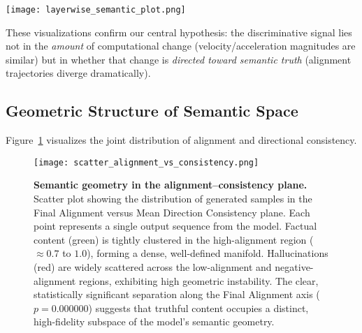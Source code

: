 \documentclass[11pt]{article}
\begin{document}
\begin{figure*}[t]
\centering
\texttt{[image: layerwise\_semantic\_plot.png]}
\caption{\textbf{Comprehensive trajectory dynamics analysis.} (Top-left) Velocity distributions overlap substantially—both factual and hallucinated content undergo similar magnitudes of representational change. (Top-right) Acceleration (directional consistency) shows similar distributions. (Bottom-left) Alignment gain separates classes: factual content increases alignment while hallucinations decrease. (Bottom-right) Convergence analysis reveals factual content converges in deeper layers (8--10) while hallucinations show early pseudo-convergence (layers 4--6) followed by divergence.}
\label{fig:layerwise_semantic_plot}
\end{figure*}

These visualizations confirm our central hypothesis: the discriminative signal lies not in the \emph{amount} of computational change (velocity/acceleration magnitudes are similar) but in whether that change is \emph{directed toward semantic truth} (alignment trajectories diverge dramatically).

\subsection{Geometric Structure of Semantic Space}

Figure~\ref{fig:semantic_geometry_extended} visualizes the joint distribution of alignment and directional consistency.

\begin{figure}[h]
\centering
\texttt{[image: scatter\_alignment\_vs\_consistency.png]}
\caption{\textbf{Semantic geometry in the alignment--consistency plane.}
Scatter plot showing the distribution of generated samples in the Final Alignment versus Mean Direction Consistency plane.
Each point represents a single output sequence from the model.
Factual content (green) is tightly clustered in the high-alignment region ($\approx 0.7$ to $1.0$), forming a dense, well-defined manifold.
Hallucinations (red) are widely scattered across the low-alignment and negative-alignment regions, exhibiting high geometric instability.
The clear, statistically significant separation along the Final Alignment axis ($p = 0.000000$) suggests that truthful content occupies a distinct, high-fidelity subspace of the model's semantic geometry.}

\label{fig:semantic_geometry_extended}
\end{figure}
\end{document}
